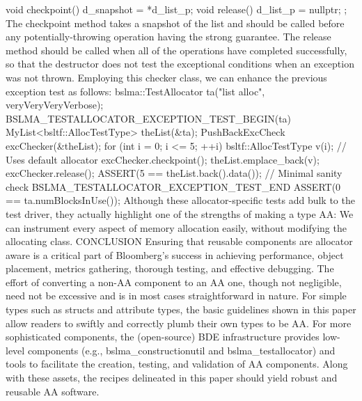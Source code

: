 {{{{{{{{{    void checkpoint() { d_snapshot = *d_list_p; }
    void release() { d_list_p = nullptr; }
};
The checkpoint method takes a snapshot of the list and should be called before any potentially-throwing operation having the strong guarantee. The release method should be called when all of the operations have completed successfully, so that the destructor does not test the exceptional conditions when an exception was not thrown. Employing this checker class, we can enhance the previous exception test as follows:
bslma::TestAllocator ta("list alloc", veryVeryVeryVerbose);
BSLMA_TESTALLOCATOR_EXCEPTION_TEST_BEGIN(ta) {
    MyList<bsltf::AllocTestType> theList(&ta);
    PushBackExcCheck excChecker(&theList);
    for (int i = 0; i <= 5; ++i) {
        bsltf::AllocTestType v(i);  // Uses default allocator
        excChecker.checkpoint();
        theList.emplace_back(v);
    }
    excChecker.release();
    ASSERT(5 == theList.back().data()); // Minimal sanity check
} BSLMA_TESTALLOCATOR_EXCEPTION_TEST_END
ASSERT(0 == ta.numBlocksInUse());
Although these allocator-specific tests add bulk to the test driver, they actually highlight one of the strengths of making a type AA: We can instrument every aspect of memory allocation easily, without modifying the allocating class.
CONCLUSION
Ensuring that reusable components are allocator aware is a critical part of Bloomberg’s success in achieving performance, object placement, metrics gathering, thorough testing, and effective debugging. The effort of converting a non-AA component to an AA one, though not negligible, need not be excessive and is in most cases straightforward in nature.
For simple types such as structs and attribute types, the basic guidelines shown in this paper allow readers to swiftly and correctly plumb their own types to be AA. For more sophisticated components, the (open-source) BDE  infrastructure provides low-level components (e.g., bslma_constructionutil and bslma_testallocator) and tools  to facilitate the creation, testing, and validation of AA components. Along with these assets, the recipes delineated in this paper should yield robust and reusable AA software.

}}}}}}}}
